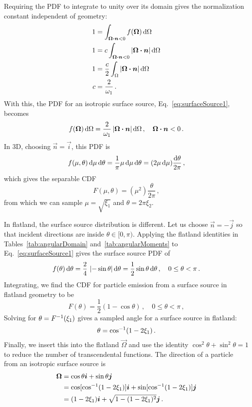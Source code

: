 Requiring the PDF to integrate to unity over its domain gives the
normalization constant independent of geometry:
\begin{align*}
  1 &= \int_{\bm{\Omega}\bm{\cdot} \bm{n} < 0} f(\bm{\Omega}) \mathop{}\!\mathrm{d}\Omega
  \\
  1 &= c \int_{\bm{\Omega}\bm{\cdot} \bm{n} < 0} \left| \bm{\Omega}\bm{\cdot} \bm{n} \right|
    \mathop{}\!\mathrm{d}\Omega
  \\
  1 &=\frac{c}{2} \int_{\Omega} \left| \bm{\Omega}\bm{\cdot} \bm{n} \right| \mathop{}\!\mathrm{d}\Omega
  \\
  c &= \frac{2}{\omega_1}\,.
\end{align*}
With this, the PDF for an isotropic surface source,
Eq.~\eqref{eq:surfaceSource1}, becomes
\begin{equation}\label{eq:surfaceSource2}
  f(\bm{\Omega}) \mathop{}\!\mathrm{d} \Omega = \frac{2}{\omega_1} \left| \bm{\Omega}\bm{\cdot} \bm{n} \right| \mathop{}\!\mathrm{d} \Omega \,,
\quad \bm{\Omega}\bm{\cdot} \bm{n} < 0 \,.
\end{equation}
In 3D, choosing $\vec{n}=\vec{i}$, this PDF is
\begin{equation*}
  f(\mu,\theta) \mathop{}\!\mathrm{d}\mu \mathop{}\!\mathrm{d}\theta
  = \frac{1}{\pi} \mu \mathop{}\!\mathrm{d}\mu \mathop{}\!\mathrm{d}\theta
  = (2 \mu \mathop{}\!\mathrm{d}\mu) \frac{\mathop{}\!\mathrm{d}\theta}{2\pi}\,,
\end{equation*}
which gives the separable CDF
\begin{equation*}
  F(\mu,\theta) = (\mu^2) \frac{\theta}{2\pi}\,,
\end{equation*}
from which we can sample $\mu=\sqrt{\xi_1}$ and $\theta=2\pi \xi_2$.

In flatland, the surface source distribution is different. Let us choose
$\vec{n} = -\vec{j}$ so that incident directions are inside
$\theta \in [0, \pi)$.
Applying the flatland identities in Tables~\ref{tab:angularDomain}
and~\ref{tab:angularMoments} to Eq.~\eqref{eq:surfaceSource1} gives the surface
source PDF of
\begin{equation*}
  f(\theta) \mathop{}\!\mathrm{d}\theta = \frac{2}{4} \, \left|  -\sin \theta \right|\mathop{}\!\mathrm{d}\theta
  = \frac{1}{2} \sin \theta\mathop{}\!\mathrm{d}\theta \,,\quad 0 \le \theta < \pi\,.
\end{equation*}
Integrating, we find the CDF for particle emission from
a surface source in flatland geometry to be
\begin{equation}\label{eq:surfaceSourceFlatland}
  F(\theta) = \frac{1}{2} \left( 1-\cos\theta \right)
  \,,\quad 0 \le \theta < \pi\,,
\end{equation}
Solving for $\theta = F^{-1}(\xi_1)$ gives a sampled angle for a surface source
in flatland:
\begin{equation*}
  \theta = \cos^{-1}(1 - 2\xi_1)\,.
\end{equation*}
Finally, we insert this into the flatland $\vec{\Omega}$ and use the identity
$\cos^2 \theta + \sin^2 \theta = 1$ to reduce the number of transcendental
functions. The direction of a particle from an isotropic surface source is
\begin{align*}
  \bm{\Omega} &= \cos \theta \bm{i} + \sin \theta \bm{j} \\
  &=  \cos[ \cos^{-1}(1 - 2\xi_1) ] \bm{i} + \sin[ \cos^{-1}(1 - 2\xi_1) ] \bm{j} \\
  &= (1 - 2\xi_1) \bm{i} + \sqrt{1 - (1 - 2\xi_1)^2} \bm{j}\,.
\end{align*}

